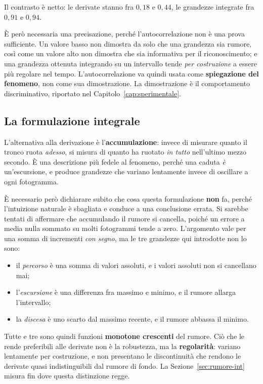 Il contrasto è netto: le derivate stanno fra $0{,}18$ e $0{,}44$, le grandezze
integrate fra $0{,}91$ e $0{,}94$.

È però necessaria una precisazione, perché l'autocorrelazione non è una prova
sufficiente. Un valore basso non dimostra da solo che una grandezza sia rumore,
così come un valore alto non dimostra che sia informativa per il
riconoscimento; e una grandezza ottenuta integrando su un intervallo tende
\emph{per costruzione} a essere più regolare nel tempo. L'autocorrelazione va
quindi usata come \textbf{spiegazione del fenomeno}, non come sua
dimostrazione. La dimostrazione è il comportamento discriminativo, riportato
nel Capitolo~\ref{cap:sperimentale}.

\subsection{La formulazione integrale}

L'alternativa alla derivazione è l'\textbf{accumulazione}: invece di misurare
quanto il tronco ruota \emph{adesso}, si misura di quanto ha ruotato \emph{in
tutto} nell'ultimo mezzo secondo. È una descrizione più fedele al fenomeno,
perché una caduta \emph{è} un'escursione, e produce grandezze che variano
lentamente invece di oscillare a ogni fotogramma.

È necessario però dichiarare subito che cosa questa formulazione \textbf{non}
fa, perché l'intuizione naturale è sbagliata e conduce a una conclusione
errata. Si sarebbe tentati di affermare che accumulando il rumore si cancella,
poiché un errore a media nulla sommato su molti fotogrammi tende a zero.
L'argomento vale per una somma di incrementi \emph{con segno}, ma le tre
grandezze qui introdotte non lo sono:

\begin{itemize}
    \item il \emph{percorso} è una somma di valori assoluti, e i valori assoluti
          non si cancellano mai;
    \item l'\emph{escursione} è una differenza fra massimo e minimo, e il rumore
          allarga l'intervallo;
    \item la \emph{discesa} è uno scarto dal massimo recente, e il rumore
          abbassa il minimo.
\end{itemize}

Tutte e tre sono quindi funzioni \textbf{monotone crescenti} del rumore. Ciò che
le rende preferibili alle derivate non è la robustezza, ma la
\textbf{regolarità}: variano lentamente per costruzione, e non presentano le
discontinuità che rendono le derivate quasi indistinguibili dal rumore di
fondo. La Sezione~\ref{sec:rumore-int} misura fin dove questa distinzione
regge.

